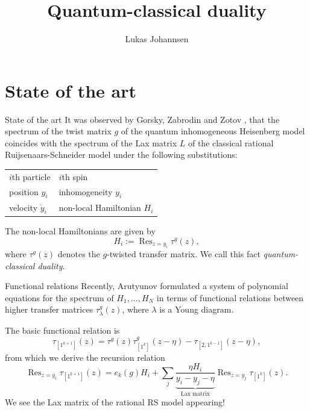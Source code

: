 \documentclass[11pt]{beamer}
\author{Lukas Johannsen}
\title{Quantum-classical duality}
\institute{University of Hamburg}
\theoremstyle{remark}
\theoremstyle{remark}
\begin{document}
\begin{frame}
\titlepage
\end{frame}


\section{State of the art}

\begin{frame}{State of the art}
It was observed by Gorsky, Zabrodin and Zotov \cite{article:gorsky:2014}, that the spectrum of the twist matrix $g$ of the quantum inhomogeneous Heisenberg model coincides with the spectrum of the Lax matrix $L$ of the classical rational Ruijsenaars-Schneider model under the following substitutions:

\begin{center}
\begin{tabular}{|l||l|}
\hline
$i$th particle & $i$th spin \\
position $y_i$ & inhomogeneity $y_i$ \\
velocity $\dot y_i$ & non-local Hamiltonian $H_i$ \\
\hline
\end{tabular}
\end{center}
The non-local Hamiltonians are given by
\begin{equation*}
H_i := \operatorname{Res}_{z=y_i} \tau^g(z),
\end{equation*}
where $\tau^g(z)$ denotes the $g$-twisted transfer matrix. We call this fact \emph{quantum-classical duality}.
\end{frame}

\begin{frame}{Functional relations}
Recently, Arutyunov \cite{book:arutyunov:betheAnsatz} formulated a system of polynomial equations for the spectrum of $H_1,...,H_N$ in terms of functional relations between higher transfer matrices $\tau_\lambda^g(z)$, where $\lambda$ is a Young diagram.

The basic functional relation is
\begin{equation*}
\tau_{[1^{k+1}]}(z) = \tau^g(z) \tau_{[1^k]}^g(z-\eta) - \tau_{[2,1^{k-1}]}(z-\eta),
\end{equation*}
from which we derive the recursion relation
\begin{equation*}
\operatorname{Res}_{z=y_i} \tau_{[1^{k+1}]}(z) = e_k(g) H_i + \sum_j \underset{\text{Lax matrix}}{\underbrace{\frac{\eta H_i}{y_i-y_j-\eta}}} \operatorname{Res}_{z=y_j} \tau_{[1^k]}(z).
\end{equation*}
We see the Lax matrix of the rational RS model appearing!
\end{frame}
\end{document}
